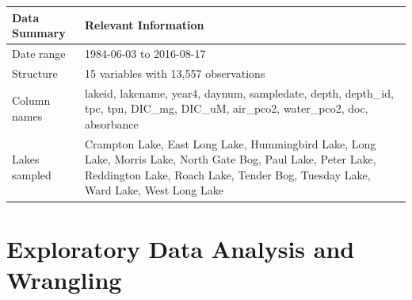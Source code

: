\documentclass[12pt,]{article}
\begin{document}
\begin{longtable}[]{@{}ll@{}}
\toprule
\begin{minipage}[b]{0.26\columnwidth}\raggedright\strut
Data Summary\strut
\end{minipage} & \begin{minipage}[b]{0.30\columnwidth}\raggedright\strut
Relevant Information\strut
\end{minipage}\tabularnewline
\midrule
\endhead
\begin{minipage}[t]{0.26\columnwidth}\raggedright\strut
Date range\strut
\end{minipage} & \begin{minipage}[t]{0.30\columnwidth}\raggedright\strut
1984-06-03 to 2016-08-17\strut
\end{minipage}\tabularnewline
\begin{minipage}[t]{0.26\columnwidth}\raggedright\strut
Structure\strut
\end{minipage} & \begin{minipage}[t]{0.30\columnwidth}\raggedright\strut
15 variables with 13,557 observations\strut
\end{minipage}\tabularnewline
\begin{minipage}[t]{0.26\columnwidth}\raggedright\strut
Column names\strut
\end{minipage} & \begin{minipage}[t]{0.30\columnwidth}\raggedright\strut
lakeid, lakename, year4, daynum, sampledate, depth, depth\_id, tpc, tpn,
DIC\_mg, DIC\_uM, air\_pco2, water\_pco2, doc, absorbance\strut
\end{minipage}\tabularnewline
\begin{minipage}[t]{0.26\columnwidth}\raggedright\strut
Lakes sampled\strut
\end{minipage} & \begin{minipage}[t]{0.30\columnwidth}\raggedright\strut
Crampton Lake, East Long Lake, Hummingbird Lake, Long Lake, Morris Lake,
North Gate Bog, Paul Lake, Peter Lake, Reddington Lake, Roach Lake,
Tender Bog, Tuesday Lake, Ward Lake, West Long Lake\strut
\end{minipage}\tabularnewline
\bottomrule
\end{longtable}

\newpage

\section{Exploratory Data Analysis and
Wrangling}\label{exploratory-data-analysis-and-wrangling}
\end{document}
